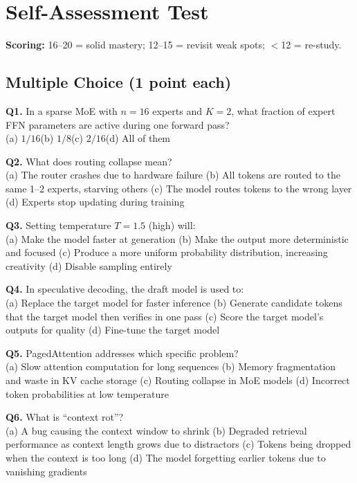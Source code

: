 \documentclass[11pt, a4paper]{article}
\begin{document}
\newpage
\section{Self-Assessment Test}

\textbf{Scoring:} 16--20 = solid mastery; 12--15 = revisit weak spots; $<$12 = re-study.

\subsection*{Multiple Choice (1 point each)}

\textbf{Q1.} In a sparse MoE with $n=16$ experts and $K=2$, what fraction of expert FFN parameters are active during one forward pass?\\
(a) $1/16$\quad (b) $1/8$\quad (c) $2/16$\quad (d) All of them

\textbf{Q2.} What does routing collapse mean?\\
(a) The router crashes due to hardware failure\quad
(b) All tokens are routed to the same 1--2 experts, starving others\quad
(c) The model routes tokens to the wrong layer\quad
(d) Experts stop updating during training

\textbf{Q3.} Setting temperature $T = 1.5$ (high) will:\\
(a) Make the model faster at generation\quad
(b) Make the output more deterministic and focused\quad
(c) Produce a more uniform probability distribution, increasing creativity\quad
(d) Disable sampling entirely

\textbf{Q4.} In speculative decoding, the draft model is used to:\\
(a) Replace the target model for faster inference\quad
(b) Generate candidate tokens that the target model then verifies in one pass\quad
(c) Score the target model's outputs for quality\quad
(d) Fine-tune the target model

\textbf{Q5.} PagedAttention addresses which specific problem?\\
(a) Slow attention computation for long sequences\quad
(b) Memory fragmentation and waste in KV cache storage\quad
(c) Routing collapse in MoE models\quad
(d) Incorrect token probabilities at low temperature

\textbf{Q6.} What is ``context rot''?\\
(a) A bug causing the context window to shrink\quad
(b) Degraded retrieval performance as context length grows due to distractors\quad
(c) Tokens being dropped when the context is too long\quad
(d) The model forgetting earlier tokens due to vanishing gradients
\end{document}
